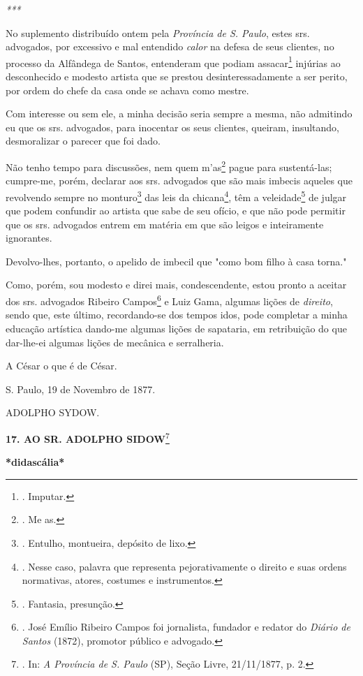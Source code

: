 \emph{***}

No suplemento distribuído ontem pela \emph{Província de S. Paulo}, estes
srs. advogados, por excessivo e mal entendido \emph{calor} na defesa de
seus clientes, no processo da Alfândega de Santos, entenderam que podiam
assacar\footnote{. Imputar.} injúrias ao desconhecido e modesto artista
que se prestou desinteressadamente a ser perito, por ordem do chefe da
casa onde se achava como mestre.

Com interesse ou sem ele, a minha decisão seria sempre a mesma, não
admitindo eu que os srs. advogados, para inocentar os seus clientes,
queiram, insultando, desmoralizar o parecer que foi dado.

Não tenho tempo para discussões, nem quem m'as\footnote{. Me as.} pague
para sustentá-las; cumpre-me, porém, declarar aos srs. advogados que são
mais imbecis aqueles que revolvendo sempre no monturo\footnote{.
  Entulho, montueira, depósito de lixo.} das leis da chicana\footnote{.
  Nesse caso, palavra que representa pejorativamente o direito e suas
  ordens normativas, atores, costumes e instrumentos.}, têm a
veleidade\footnote{. Fantasia, presunção.} de julgar que podem confundir
ao artista que sabe de seu ofício, e que não pode permitir que os srs.
advogados entrem em matéria em que são leigos e inteiramente ignorantes.

Devolvo-lhes, portanto, o apelido de imbecil que "como bom filho à casa
torna."

Como, porém, sou modesto e direi mais, condescendente, estou pronto a
aceitar dos srs. advogados Ribeiro Campos\footnote{. José Emílio Ribeiro
  Campos foi jornalista, fundador e redator do \emph{Diário de Santos}
  (1872), promotor público e advogado.}
\protect\hypertarget{Secao_Sem_Titulo-23}{}{}e Luiz Gama, algumas lições
de \emph{direito}, sendo que, este último, recordando-se dos tempos
idos, pode completar a minha educação artística dando-me algumas lições
de sapataria, em retribuição do que dar-lhe-ei algumas lições de
mecânica e serralheria.

A César o que é de César.

S. Paulo, 19 de Novembro de 1877.

ADOLPHO SYDOW.

\textbf{17. AO SR. ADOLPHO SIDOW}\footnote{. In: \emph{A Província de S.
  Paulo} (SP), Seção Livre, 21/11/1877, p. 2.}

\textbf{*didascália*}

